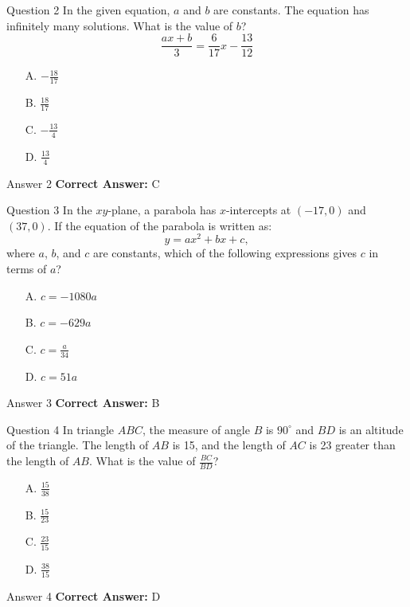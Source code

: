 \documentclass{beamer}
\begin{document}
\begin{frame}{Question 2}
\small
In the given equation, \(a\) and \(b\) are constants.
The equation has infinitely many solutions.
What is the value of \(b\)?
\[
\frac{ax + b}{3} = \frac{6}{17}x - \frac{13}{12}
\]
\vspace{0.35cm}
\begin{enumerate}
    \item[A.] \(-\frac{18}{17}\)
    \item[B.] \(\frac{18}{17}\)
    \item[C.] \(-\frac{13}{4}\)
    \item[D.] \(\frac{13}{4}\)
\end{enumerate}
\end{frame}
\begin{frame}{Answer 2}
\small
\textbf{Correct Answer:} C
\end{frame}

\begin{frame}{Question 3}
\small
In the \(xy\)-plane, a parabola has \(x\)-intercepts at \((-17, 0)\) and \((37, 0)\).
If the equation of the parabola is written as:
\[
y = ax^2 + bx + c,
\]
where \(a\), \(b\), and \(c\) are constants,
which of the following expressions gives \(c\) in terms of \(a\)?
\vspace{0.35cm}
\begin{enumerate}
    \item[A.] \(c = -1080a\)
    \item[B.] \(c = -629a\)
    \item[C.] \(c = \frac{a}{34}\)
    \item[D.] \(c = 51a\)
\end{enumerate}
\end{frame}
\begin{frame}{Answer 3}
\small
\textbf{Correct Answer:} B
\end{frame}

\begin{frame}{Question 4}
\small
In triangle \(ABC\), the measure of angle \(B\) is \(90^\circ\) and \(BD\) is an altitude of the triangle.
The length of \(AB\) is 15, and the length of \(AC\) is 23 greater than the length of \(AB\).
What is the value of \(\frac{BC}{BD}\)?
\vspace{0.35cm}
\begin{enumerate}
    \item[A.] \(\frac{15}{38}\)
    \item[B.] \(\frac{15}{23}\)
    \item[C.] \(\frac{23}{15}\)
    \item[D.] \(\frac{38}{15}\)
\end{enumerate}
\end{frame}
\begin{frame}{Answer 4}
\small
\textbf{Correct Answer:} D
\end{frame}
\end{document}
